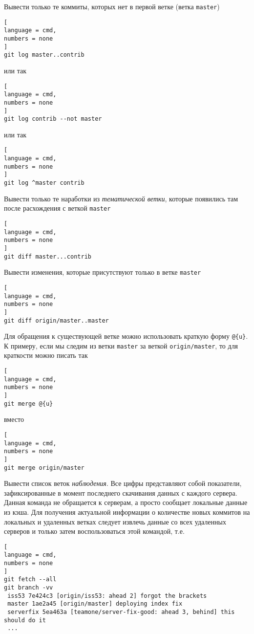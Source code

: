 \documentclass[%
	11pt,
	a4paper,
	utf8,
		]{article}
\begin{document}
Вывести только те коммиты, которых нет в первой ветке (ветка \texttt{master})

\begin{lstlisting}[
language = cmd,
numbers = none
]
git log master..contrib
\end{lstlisting}
или так
\begin{lstlisting}[
language = cmd,
numbers = none
]
git log contrib --not master
\end{lstlisting}
или так
\begin{lstlisting}[
language = cmd,
numbers = none
]
git log ^master contrib
\end{lstlisting}


Вывести только те наработки из \emph{тематической ветки}, которые появились там после расхождения с веткой \texttt{master}

\begin{lstlisting}[
language = cmd,
numbers = none
]
git diff master...contrib
\end{lstlisting}

Вывести изменения, которые присутствуют только в ветке \texttt{master}

\begin{lstlisting}[
language = cmd,
numbers = none
]
git diff origin/master..master
\end{lstlisting}

Для обращения к существующей ветке можно использовать краткую форму \texttt{@\{u\}}. К примеру, если мы следим из ветки \texttt{master} за веткой \texttt{origin/master}, то для краткости можно писать так

\begin{lstlisting}[
language = cmd,
numbers = none
]
git merge @{u}
\end{lstlisting}
вместо
\begin{lstlisting}[
language = cmd,
numbers = none
]
git merge origin/master
\end{lstlisting}

Вывести список веток \emph{наблюдения}. Все цифры представляют собой показатели, зафиксированные в момент последнего скачивания данных с каждого сервера. Данная команда не обращается к серверам, а просто сообщает локальные данные из кэша. Для получения актуальной информации о количестве новых коммитов на локальных и удаленных ветках следует извлечь данные со всех удаленных серверов и только затем воспользоваться этой командой, т.е.
\begin{lstlisting}[
language = cmd,
numbers = none
]
git fetch --all
git branch -vv
 iss53 7e424c3 [origin/iss53: ahead 2] forgot the brackets
 master 1ae2a45 [origin/master] deploying index fix
 serverfix 5ea463a [teamone/server-fix-good: ahead 3, behind] this should do it
 ...
\end{lstlisting} 
\end{document}
